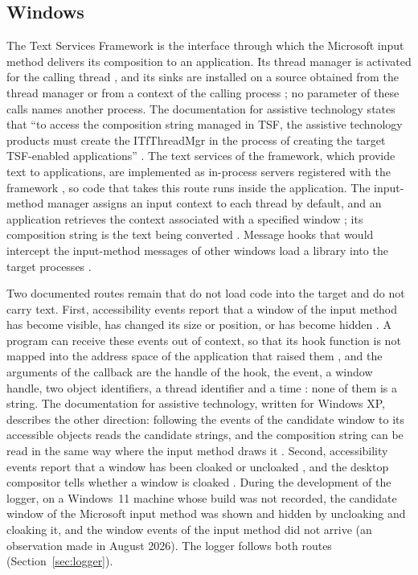 \subsection{Windows}
\label{sec:observability-windows}

The Text Services Framework is the interface through which the Microsoft input method delivers its composition to
an application. Its thread manager is activated for the calling thread \citep{ms-tsf-activate}, and its sinks are
installed on a source obtained from the thread manager or from a context of the calling process
\citep{ms-tsf-advisesink}; no parameter of these calls names another process. The documentation for assistive
technology states that ``to access the composition string managed in TSF, the assistive technology products must
create the ITfThreadMgr in the process of creating the target TSF-enabled applications''
\citep{ms-ime-tsf-accessibility}. The text services of the framework, which provide text to applications, are
implemented as in-process servers registered with the framework \citep{ms-tsf-architecture}, so code that takes this
route runs inside the application. The input-method manager assigns an input context to each thread by default, and
an application retrieves the context associated with a specified window \citep{ms-imm-inputcontext}; its
composition string is the text being converted \citep{ms-imm-getcompositionstring}.
Message hooks that would intercept the input-method messages of other windows load a library into the target
processes \citep{ms-setwindowshookex}.

Two documented routes remain that do not load code into the target and do not carry text. First, accessibility
events report that a window of the input method has become visible, has changed its size or position, or has become
hidden \citep{ms-eventconstants}. A program can receive these events out of context, so that its hook
function is not mapped into the address space of the application that raised them \citep{ms-outofcontext,
ms-setwineventhook}, and the arguments of the callback are the handle of the hook, the event, a window handle, two
object identifiers, a thread identifier and a time \citep{ms-wineventproc}: none of them is a string. The
documentation for assistive technology, written for Windows XP, describes the other direction: following the events
of the candidate window to its accessible objects reads the candidate strings, and the composition string can be read
in the same way where the input method draws it \citep{ms-ime-tsf-accessibility}. Second, accessibility events
report that a window has been cloaked or uncloaked \citep{ms-eventconstants}, and the desktop compositor tells whether a window is cloaked
\citep{ms-dwm-attribute}. During the development of the logger, on a Windows~11 machine whose build was not recorded,
the candidate window of the Microsoft input method was shown and hidden by uncloaking and cloaking it, and the window
events of the input method did not arrive (an observation made in August 2026). The logger follows both routes
(Section~\ref{sec:logger}).


